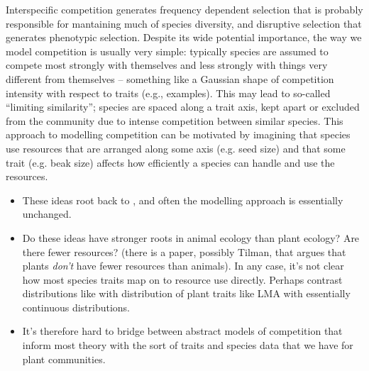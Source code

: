 \documentclass[a4paper,11pt]{article}
\begin{document}
Interspecific competition generates frequency dependent selection that
is probably responsible for mantaining much of species diversity, and
disruptive selection that generates phenotypic selection.  Despite its
wide potential importance, the way we model competition is usually
very simple: typically species are assumed to compete most strongly
with themselves and less strongly with things very different from
themselves -- something like a Gaussian shape of competition intensity
with respect to traits (e.g., examples).
This may lead to so-called ``limiting similarity''; species are spaced
along a trait axis, kept apart or excluded from the community due to
intense competition between similar species.
This approach to modelling competition can be motivated by imagining
that species use resources that are arranged along some axis
(e.g. seed size) and that some trait (e.g. beak size) affects how
efficiently a species can handle and use the resources.

\begin{itemize}
\item These ideas root back to \citet{MacArthur-1967}, and often the
  modelling approach is essentially unchanged.
\item Do these ideas have stronger roots in animal ecology than plant
  ecology?  Are there fewer resources?  (there is a paper, possibly
  Tilman, that argues that plants \emph{don't} have fewer resources
  than animals).  In any case, it's not clear how most species traits
  map on to resource use directly.  Perhaps contrast distributions
  like \citet{Hermoyian-2002} with distribution of plant traits like
  LMA with essentially continuous distributions.
\item It's therefore hard to bridge between abstract models of
  competition that inform most theory with the sort of traits and
  species data that we have for plant communities.
\end{itemize}
\end{document}
